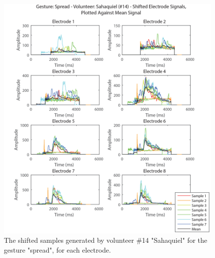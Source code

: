 \documentclass[journal]{IEEEtran}
\begin{document}
    \begin{figure}[H]
    \centering
    \includegraphics[width=1\columnwidth]{EMG/Spread_Min_Sahaquiel_Shifted}
    \caption{The shifted samples generated by volunteer \#14 "Sahaquiel" for the gesture "spread", for each electrode.}
    \label{Spread_Min_Sahaquiel_Shifted}
    \end{figure}
    
\end{document}
